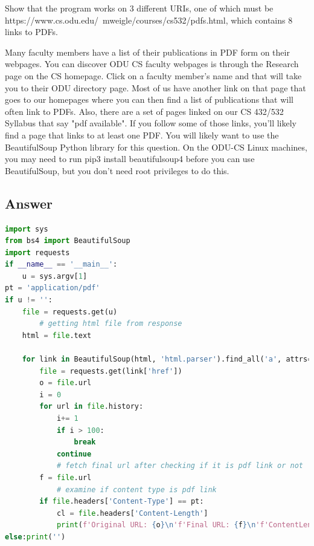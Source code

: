 \documentclass[12pt]{article}
\begin{document}
Show that the program works on 3 different URIs, one of which must be https://www.cs.odu.edu/~mweigle/courses/cs532/pdfs.html, which contains 8 links to PDFs.

Many faculty members have a list of their publications in PDF form on their webpages. You can discover ODU CS faculty webpages is through the Research page on the CS homepage. Click on a faculty member's name and that will take you to their ODU directory page. Most of us have another link on that page that goes to our homepages where you can then find a list of publications that will often link to PDFs.\newline\newline
Also, there are a set of pages linked on our CS 432/532 Syllabus that say "pdf available". If you follow some of those links, you'll likely find a page that links to at least one PDF.\newline\newline
You will likely want to use the BeautifulSoup Python library for this question. On the ODU-CS Linux machines, you may need to run pip3 install beautifulsoup4 before you can use BeautifulSoup, but you don't need root privileges to do this.
\subsection*{Answer}
\begin{lstlisting}[language=Python, caption=Python code, label=lst:copy]
import sys
from bs4 import BeautifulSoup
import requests
if __name__ == '__main__':
    u = sys.argv[1]
pt = 'application/pdf'
if u != '':
    file = requests.get(u)
        # getting html file from response
    html = file.text

    for link in BeautifulSoup(html, 'html.parser').find_all('a', attrs={'href': True}):
        file = requests.get(link['href'])
        o = file.url
        i = 0
        for url in file.history:
            i+= 1
            if i > 100:
                break
            continue
            # fetch final url after checking if it is pdf link or not
        f = file.url
            # examine if content type is pdf link
        if file.headers['Content-Type'] == pt:
            cl = file.headers['Content-Length']
            print(f'Original URL: {o}\n'f'Final URL: {f}\n'f'ContentLength: {cl} bytes\n')
else:print('')


\end{lstlisting}
\newline
\end{document}

